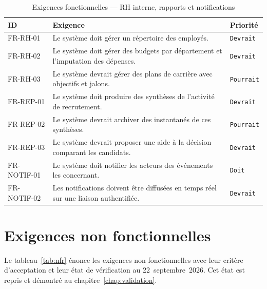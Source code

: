 \begin{table}[htbp]
  \centering
  \caption{Exigences fonctionnelles — RH interne, rapports et notifications}
  \label{tab:fr_hr}
  \begin{tabularx}{\textwidth}{L{2.4cm} X L{1.9cm}}
    \toprule
    \textbf{ID} & \textbf{Exigence} & \textbf{Priorité} \\
    \midrule
    FR-RH-01    & Le système doit gérer un répertoire des employés. & \texttt{Devrait} \\
    FR-RH-02    & Le système doit gérer des budgets par département et l'imputation des dépenses. & \texttt{Devrait} \\
    FR-RH-03    & Le système devrait gérer des plans de carrière avec objectifs et jalons. & \texttt{Pourrait} \\
    FR-REP-01   & Le système doit produire des synthèses de l'activité de recrutement. & \texttt{Devrait} \\
    FR-REP-02   & Le système devrait archiver des instantanés de ces synthèses. & \texttt{Pourrait} \\
    FR-REP-03   & Le système devrait proposer une aide à la décision comparant les candidats. & \texttt{Devrait} \\
    FR-NOTIF-01 & Le système doit notifier les acteurs des événements les concernant. & \texttt{Doit} \\
    FR-NOTIF-02 & Les notifications doivent être diffusées en temps réel sur une liaison authentifiée. & \texttt{Devrait} \\
    \bottomrule
  \end{tabularx}
\end{table}

\section{Exigences non fonctionnelles}
\label{sec:nonfunctional_requirements}

Le tableau~\ref{tab:nfr} énonce les exigences non fonctionnelles avec leur
critère d'acceptation et leur état de vérification au
22~septembre~2026. Cet état est repris et démontré au
chapitre~\ref{chap:validation}.

